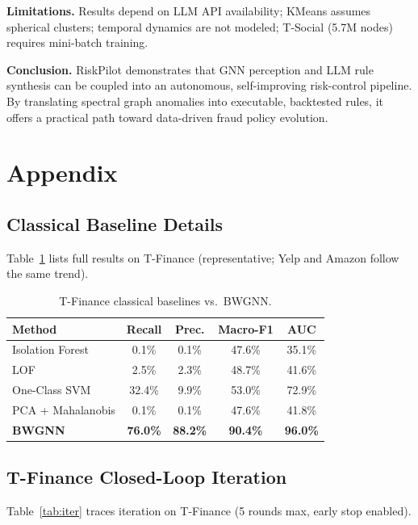 \documentclass[sigconf,nonacm]{acmart}
\begin{document}
\textbf{Limitations.}
Results depend on LLM API availability; KMeans assumes spherical clusters; temporal dynamics are not modeled; T-Social (5.7M nodes) requires mini-batch training.

\textbf{Conclusion.}
RiskPilot demonstrates that GNN perception and LLM rule synthesis can be coupled into an autonomous, self-improving risk-control pipeline.
By translating spectral graph anomalies into executable, backtested rules, it offers a practical path toward data-driven fraud policy evolution.

\balance



\appendix
\section{Appendix}
\label{app:main}

\subsection{Classical Baseline Details}
\label{app:baselines}
Table~\ref{tab:trad} lists full results on T-Finance (representative; Yelp and Amazon follow the same trend).

\begin{table}[h]
\caption{T-Finance classical baselines vs.\ BWGNN.}
\label{tab:trad}
\footnotesize
\begin{tabular}{lcccc}
\toprule
Method & Recall & Prec. & Macro-F1 & AUC \\
\midrule
Isolation Forest   & 0.1\% & 0.1\% & 47.6\% & 35.1\% \\
LOF                & 2.5\% & 2.3\% & 48.7\% & 41.6\% \\
One-Class SVM      & 32.4\% & 9.9\% & 53.0\% & 72.9\% \\
PCA + Mahalanobis  & 0.1\% & 0.1\% & 47.6\% & 41.8\% \\
\textbf{BWGNN}     & \textbf{76.0\%} & \textbf{88.2\%} & \textbf{90.4\%} & \textbf{96.0\%} \\
\bottomrule
\end{tabular}
\end{table}

\subsection{T-Finance Closed-Loop Iteration}
\label{app:iteration}
Table~\ref{tab:iter} traces iteration on T-Finance (5 rounds max, early stop enabled).
\end{document}

